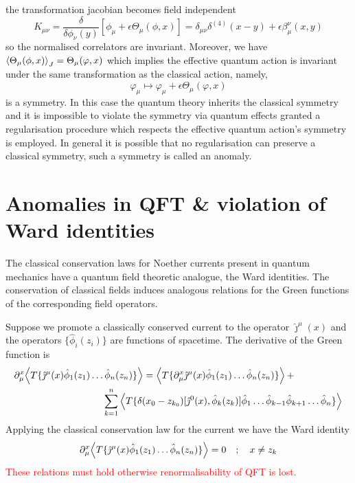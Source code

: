 \documentclass[11pt, a4paper]{article}
\theoremstyle{definition}
\theoremstyle{plain}
\begin{document}
the transformation jacobian becomes field independent
\begin{equation}
  K_{\mu\nu} = \frac{\delta}{\delta\phi_\nu(y)}[\phi_\mu +\epsilon\Theta_\mu(\phi, x)]
  = \delta_{\mu\nu}\delta^{(4)}(x - y) + \epsilon\beta^\nu_\mu(x, y)
\end{equation}
so the normalised correlators are invariant. Moreover, we have
$\braket{\Theta_\mu(\phi, x)}_J = \Theta_\mu(\varphi, x)$ which implies
the effective quantum action is invariant under the same transformation as the 
classical action, namely,
\begin{equation}
  \varphi_\mu \mapsto \varphi_\mu + \epsilon\Theta_\mu(\varphi, x)
\end{equation}
is a symmetry. In this case the quantum theory inherits the classical symmetry
and it is impossible to violate the symmetry via quantum effects granted
a regularisation procedure which respects the effective quantum
action's symmetry is employed. In general it is possible that no regularisation
can preserve a classical symmetry, such a symmetry is called an anomaly.

\section{Anomalies in QFT \& violation of Ward identities}

The classical conservation laws for Noether currents present in quantum mechanics
have a quantum field theoretic analogue, the Ward identities. The conservation
of classical fields induces analogous relations for the Green functions of the 
corresponding field operators.

Suppose we promote a classically conserved current to the operator $\hat{\jmath}^\mu(x)$
and the operators $\{\hat{\phi}_i(z_i)\}$ are functions of spacetime. The 
derivative of the Green function is
\begin{equation*}
  \begin{aligned}
    \partial^x_{\mu}\!\Braket{T \{
    \hat{\jmath}^\mu(x)\hat{\phi}_{1}(z_1)\dots \hat{\phi}_{n}(z_n) \}} = 
    \Braket{T\{\partial^x_{\mu}\hat{\jmath}^\mu(x)
    \hat{\phi}_{1}(z_1)\dots\hat{\phi}_{n}(z_n) \}} + \qquad \quad \qquad & \\
    \sum_{k = 1}^{n}{ \Braket{T\{ \delta(x_0 - z_{k_0})
    [\hat{\jmath}^0(x), \hat{\phi}_k(z_k)]
\hat{\phi}_1 \dots \hat{\phi}_{k-1}\hat{\phi}_{k+1} \dots \hat{\phi}_{n} \} } } &
  \end{aligned}
\end{equation*}
Applying the classical conservation law for the current we have
the Ward identity
\begin{equation}
  \partial^x_{\mu}\!\Braket{T \{
    \hat{\jmath}^\mu(x)\hat{\phi}_{1}(z_1)\dots \hat{\phi}_{n}(z_n) \}} = 0 \quad ;\quad x \neq z_k
\end{equation}
\textcolor{red}{These relations must hold otherwise renormalisability of QFT is lost.}



\newpage


\end{document}
